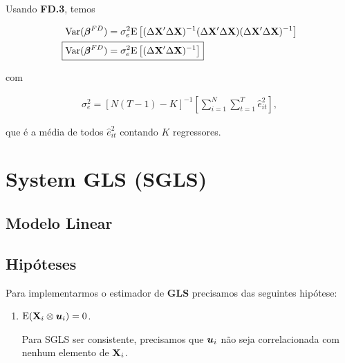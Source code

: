 \documentclass[11pt, oneside, a4paper, article]{article}
\numberwithin{equation}{section}
\begin{document}
\begin{description}
	Usando \textbf{FD.3}, temos

	\vspace{-1 em}
	\begin{align*} 
		\Var( \betavec^{FD} ) &= 
		\sigma_{e}^{2}
		\E \left[
			( \Delta \Xmat' \Delta \Xmat )^{-1}
			( \Delta \Xmat' \Delta \Xmat )
			( \Delta \Xmat' \Delta \Xmat )^{-1} 
		\right]
		\\
		\Aboxed{
			\Var( \betavec^{FD} ) &= 
			\sigma^2_{e}
			\E \left[
				( \Delta \Xmat' \Delta \Xmat )^{-1} 
		\right]}
	\end{align*}

	\noindent 
	com

	\vspace{-1 em}
	\begin{align*} 
		\sigma^2_{e} = 
		\left[ N ( T - 1 ) - K \right]^{-1}
		\left[  
			\sum_{i=1}^{N} 
			\sum_{t=1}^{T}
			\hat{e}_{it}^{2}
		\right],
	\end{align*}

	\noindent
	que é a média de todos $\hat{e}^{2}_{it}$ contando $K$ regressores.

	\clearpage
	\section{System GLS (SGLS)}

	\noindent
	\citet[Sec.7.4 -- Consistency and Asymptotic Normality of Generalized Least Squares, p.153]{wool-2010} 

	\subsection{Modelo Linear}

	\subsection{Hipóteses}

	Para implementarmos o estimador de \textbf{GLS} precisamos das seguintes hipótese:

	\begin{enumerate}
		\item %

			$\text{E}(\mathbf{X}_{i} \otimes \boldsymbol{u}_{i}) = 0$.

			Para SGLS ser consistente, precisamos que $\boldsymbol{u}_{i}$ não seja correlacionada com nenhum elemento de $\mathbf{X}_{i}$.


\end{enumerate}
\end{description}
\end{document}
